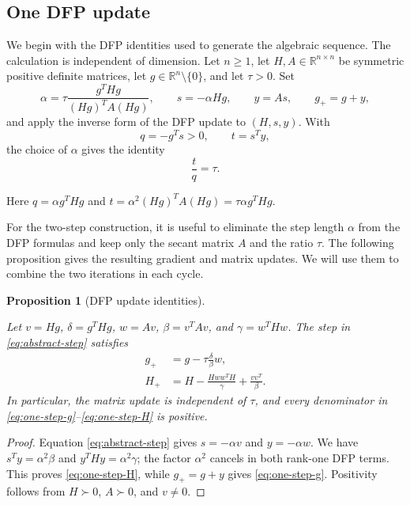 \documentclass[11pt]{article}
\newtheorem{proposition}[theorem]{Proposition}
\newcommand{\R}{\mathbb R}
\begin{document}
\subsection{One DFP update}

We begin with the DFP identities used to generate the algebraic sequence.  The
calculation is independent of dimension.  Let $n\ge1$, let
$H,A\in\R^{n\times n}$ be symmetric positive definite matrices, let
$g\in\R^n\setminus\{0\}$, and let $\tau>0$.  Set
\begin{equation}\label{eq:abstract-step}
\alpha=\tau\frac{g^THg}{(Hg)^TA(Hg)},\qquad
s=-\alpha Hg,\qquad y=As,\qquad g_+=g+y,
\end{equation}
and apply the inverse form of the DFP update to $(H,s,y)$.  With
\[
q=-g^Ts>0,\qquad t=s^Ty,
\]
the choice of $\alpha$ gives the identity
\begin{equation}\label{eq:line-ratio}
\frac tq=\tau.
\end{equation}

Here $q=\alpha g^THg$ and
$t=\alpha^2(Hg)^TA(Hg)=\tau\alpha g^THg$.


For the two-step construction, it is useful to eliminate the step length
$\alpha$ from the DFP formulas and keep only the secant matrix $A$ and the
ratio $\tau$.  The following proposition gives the resulting gradient and
matrix updates.  We will use them to combine the two iterations in each cycle.

\begin{proposition}[DFP update identities]\label{prop:one-step}






Let $v=Hg$, $\delta=g^THg$, $w=Av$, $\beta=v^TAv$, and
$\gamma=w^THw$.  The step in \eqref{eq:abstract-step} satisfies
\begin{align}
g_+&=g-\tau\frac{\delta}{\beta}w,
\label{eq:one-step-g}\\
H_+&=H-\frac{Hww^TH}{\gamma}+\frac{vv^T}{\beta}.
\label{eq:one-step-H}
\end{align}
In particular, the matrix update is independent of $\tau$, and every
denominator in \eqref{eq:one-step-g}--\eqref{eq:one-step-H} is positive.
\end{proposition}

\begin{proof}
Equation \eqref{eq:abstract-step} gives $s=-\alpha v$ and
$y=-\alpha w$.  We have $s^Ty=\alpha^2\beta$ and
$y^THy=\alpha^2\gamma$; the factor $\alpha^2$ cancels in both rank-one DFP
terms.  This proves \eqref{eq:one-step-H}, while $g_+=g+y$ gives
\eqref{eq:one-step-g}.  Positivity follows from $H\succ0$, $A\succ0$, and
$v\ne0$.
\end{proof}
\end{document}
